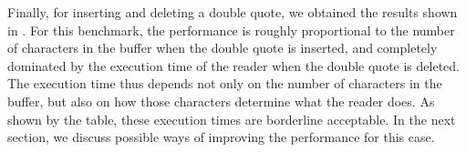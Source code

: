 Finally, for inserting and deleting a double quote, we obtained the
results shown in .  For this
benchmark, the performance is roughly proportional to the number of
characters in the buffer when the double quote is inserted, and
completely dominated by the execution time of the reader when the
double quote is deleted.  The execution time thus depends not only on
the number of characters in the buffer, but also on how those
characters determine what the reader does.  As shown by the table,
these execution times are borderline acceptable.  In the next section,
we discuss possible ways of improving the performance for this case.

\begin{table}[htb]
\end{table}
